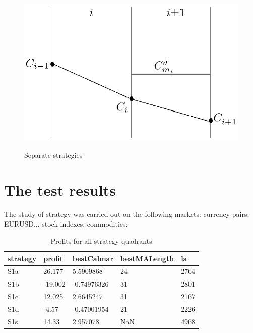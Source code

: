\documentclass{tewiart}
\begin{document}
\begin{figure}[h]
\begin{minipage}{.49\linewidth}
\label{cztero}
\end{minipage}
\begin{minipage}{.49\linewidth}
\centering 
\includegraphics[width=\textwidth]{rysunek2d.eps}
\label{mansard}
\end{minipage}
\caption{Separate strategies}
\end{figure}
\FloatBarrier


\section{The test results}
The study of strategy was carried out on the following markets:
currency pairs: EURUSD...
stock indexes: 
commodities: 

\begin{table}[!t]
\caption{Profits for all strategy quadrants} 
 \begin{center} 
 \begin{tabular}{|l|l|l|l|l|} 
 \hline \textbf{strategy} & \textbf{profit} & \textbf{bestCalmar} & \textbf{bestMALength} & \textbf{la} \\ \hline  
S1a & 26.177 & 5.5909868 & 24 & 2764\\ \hline 
S1b & -19.002 & -0.74976326 & 31 & 2801\\ \hline 
S1c & 12.025 & 2.6645247 & 31 & 2167\\ \hline 
S1d & -4.57 & -0.47001954 & 21 & 2226\\ \hline 
S1s & 14.33 & 2.957078 & NaN & 4968\\ 
\hline \end{tabular} 
 \end{center} 
 \end{table}
\FloatBarrier
\end{document}
